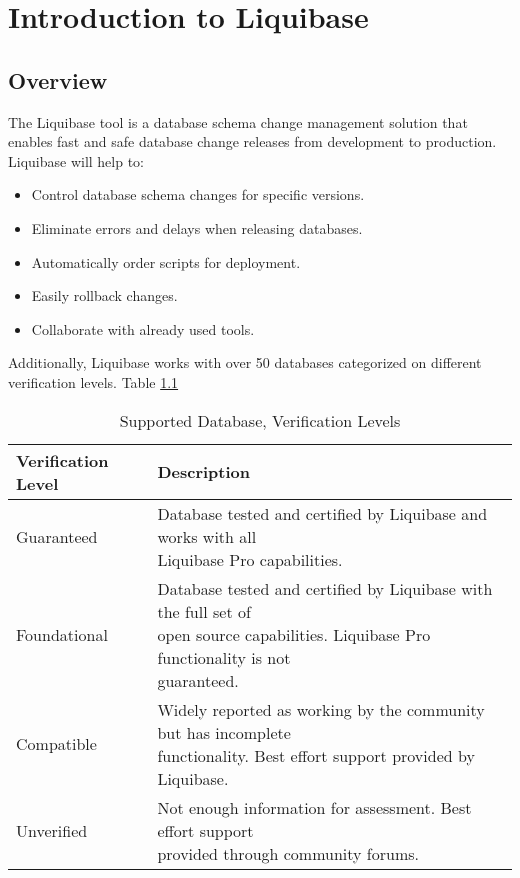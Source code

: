 

\chapter{Introduction to Liquibase}
\section{Overview}

The Liquibase \cite{Liquibase} tool is a database schema change management solution that enables fast and safe database change releases from development to production. Liquibase \cite{Liquibase} will help to:

\begin{itemize}
	\item Control database schema changes for specific versions.
	\item Eliminate errors and delays when releasing databases.
	\item Automatically order scripts for deployment.
	\item Easily rollback changes.
	\item Collaborate with already used tools.
\end{itemize}

Additionally, Liquibase \cite{Liquibase} works with over 50 databases categorized on different verification levels. Table \ref{tab:IntroductionToLiquibase:DBVerificationLevels}

\begin{table}[H]
	\centering
	\begin{tabularx}{\textwidth}{ll} 
		\toprule
		Verification Level & Description \\ 
		\midrule
		Guaranteed & \makecell[l]{Database tested and certified by Liquibase and works with all\\ Liquibase Pro capabilities.} \\[10pt]
		Foundational & \makecell[l]{Database tested and certified by Liquibase with the full set of\\ open source capabilities. Liquibase Pro functionality is not\\ guaranteed.} \\[10pt]
		Compatible & \makecell[l]{Widely reported as working by the community but has incomplete\\ functionality. Best effort support provided by Liquibase.} \\[10pt]
		Unverified & \makecell[l]{Not enough information for assessment. Best effort support\\ provided through community forums.} \\
		\bottomrule
	\end{tabularx}
	\caption{Supported Database, Verification Levels}
	\label{tab:IntroductionToLiquibase:DBVerificationLevels}
\end{table}

